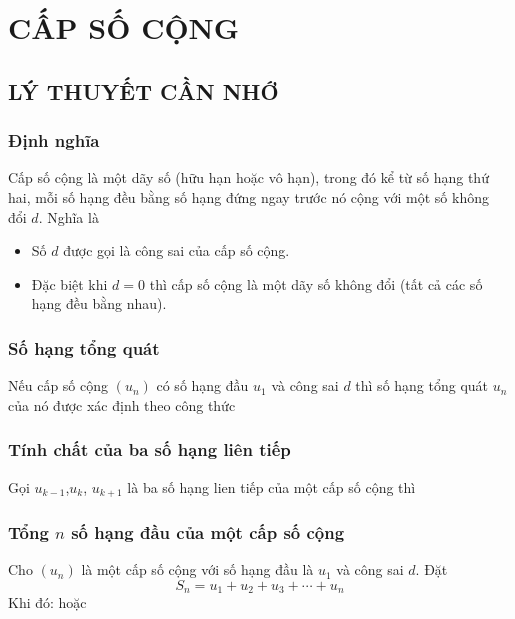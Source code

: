 \newpage\setcounter{dang}{0}
\section{CẤP SỐ CỘNG}
\subsection{LÝ THUYẾT CẦN NHỚ}
\subsubsection{Định nghĩa}
Cấp số cộng là một dãy số (hữu hạn hoặc vô hạn), trong đó kể từ số hạng thứ hai, mỗi số hạng đều bằng số hạng đứng ngay trước nó cộng với một số không đổi $d.$ Nghĩa là
\begin{note}
	\begin{itemize}
		\item [$\bullet$] Số $d$ được gọi là công sai của cấp số cộng.
		\item [$\bullet$] Đặc biệt khi $d=0$ thì cấp số cộng là một dãy số không đổi (tất cả các số hạng đều bằng nhau).
	\end{itemize}
\end{note}
\subsubsection{Số hạng tổng quát}
	Nếu cấp số cộng $\left(u_n\right)$ có số hạng đầu $u_1$ và công sai $d$ thì số hạng tổng quát $u_n$ của nó được xác định theo công thức

\subsubsection{Tính chất của ba số hạng liên tiếp}
Gọi $u_{k-1}$,$u_{k}$, $u_{k+1}$ là ba số hạng lien tiếp của một cấp số cộng thì 

\subsubsection{Tổng $ n $ số hạng đầu của một cấp số cộng}
	Cho $(u_n)$ là một cấp số cộng với số hạng đầu là $u_1$ và công sai $d$. Đặt $${{S}_{n}}={{u}_{1}}+{{u}_{2}}+{{u}_{3}}+\cdots+{{u}_{n}}$$
	Khi đó:
	hoặc 
\newpage
